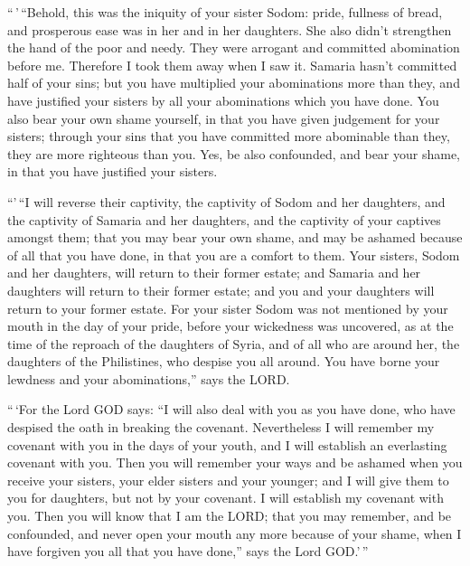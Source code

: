  ``\,'\,``Behold, this was the iniquity of your sister
Sodom: pride, fullness of bread, and prosperous ease was in her and in
her daughters. She also didn't strengthen the hand of the poor and
needy.  They were arrogant and committed abomination before
me. Therefore I took them away when I saw it.  Samaria
hasn't committed half of your sins; but you have multiplied your
abominations more than they, and have justified your sisters by all your
abominations which you have done.  You also bear your own
shame yourself, in that you have given judgement for your sisters;
through your sins that you have committed more abominable than they,
they are more righteous than you. Yes, be also confounded, and bear your
shame, in that you have justified your sisters.

 ``'\,``I will reverse their captivity, the captivity of
Sodom and her daughters, and the captivity of Samaria and her daughters,
and the captivity of your captives amongst them;  that you
may bear your own shame, and may be ashamed because of all that you have
done, in that you are a comfort to them.  Your sisters,
Sodom and her daughters, will return to their former estate; and Samaria
and her daughters will return to their former estate; and you and your
daughters will return to your former estate.  For your
sister Sodom was not mentioned by your mouth in the day of your pride,
 before your wickedness was uncovered, as at the time of
the reproach of the daughters of Syria, and of all who are around her,
the daughters of the Philistines, who despise you all around.
 You have borne your lewdness and your abominations,'' says
the LORD.

 ``\,`For the Lord GOD says: ``I will also deal with you as
you have done, who have despised the oath in breaking the covenant.
 Nevertheless I will remember my covenant with you in the
days of your youth, and I will establish an everlasting covenant with
you.  Then you will remember your ways and be ashamed when
you receive your sisters, your elder sisters and your younger; and I
will give them to you for daughters, but not by your covenant.
 I will establish my covenant with you. Then you will know
that I am the LORD;  that you may remember, and be
confounded, and never open your mouth any more because of your shame,
when I have forgiven you all that you have done,'' says the Lord
GOD.'\,''

